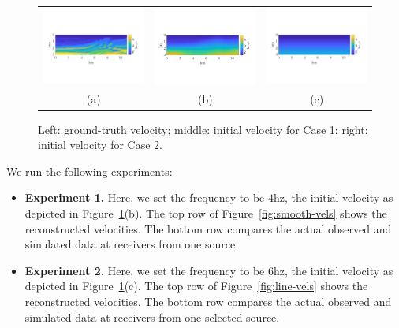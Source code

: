 \documentclass[12pt]{amsart}
\begin{document}
\begin{figure}
\centering
\begin{tabular}{ccc}
\includegraphics[width=0.33\linewidth]{Figures/marm-true.png}&
\includegraphics[width=0.33\linewidth]{Figures/smooth-init.png}&
\includegraphics[width=0.33\linewidth]{Figures/line-init.png}\\
(a)&(b)&(c)\\
\end{tabular}
\caption{Left: ground-truth velocity; middle: initial velocity for Case 1; right: initial velocity for Case 2.}
\label{fig:marm-vels}
\end{figure}

We run the following experiments:
\begin{itemize}
\item \textbf{Experiment 1.} Here, we set the frequency to be $4$hz, the initial velocity as depicted in Figure~\ref{fig:marm-vels}(b). The top row of Figure~\ref{fig:smooth-vels} shows the reconstructed velocities. The bottom row compares the actual observed and simulated data at receivers from one source. 
\item \textbf{Experiment 2.} Here, we set the frequency to be $6$hz, the initial velocity as depicted in Figure~\ref{fig:marm-vels}(c). The top row of Figure~\ref{fig:line-vels} shows the reconstructed velocities. The bottom row compares the actual observed and simulated data at receivers from one selected source. 
\end{itemize}
\end{document}
